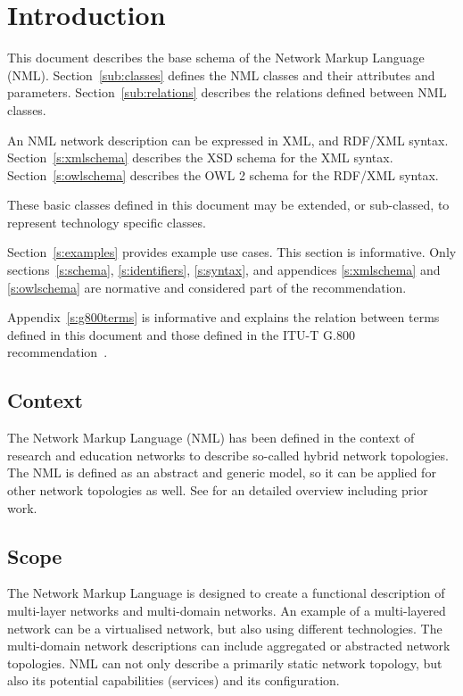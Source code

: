
\section{Introduction}%
\label{sec:introduction}

This document describes the base schema of the Network Markup Language (NML).
Section~\ref{sub:classes} defines the NML classes and their attributes and parameters.
Section~\ref{sub:relations} describes the relations defined between NML classes.

An NML network description can be expressed in XML\cite{xml}, and RDF/XML\cite{rdfxml} syntax.
Section~\ref{s:xmlschema} describes the XSD schema for the XML syntax.
Section~\ref{s:owlschema} describes the OWL 2 schema for the RDF/XML syntax.

These basic classes defined in this document may be extended, or sub-classed, 
to represent technology specific classes.

Section~\ref{s:examples} provides example use cases. This section is informative. 
Only sections~\ref{s:schema}, \ref{s:identifiers}, \ref{s:syntax}, and appendices \ref{s:xmlschema} and \ref{s:owlschema} are normative and considered 
part of the recommendation.

Appendix~\ref{s:g800terms} is informative and explains the relation between terms defined in this document and those defined in the ITU-T G.800 recommendation~\cite{g800}.

\subsection{Context}
\label{sec:context}

The Network Markup Language (NML) has been defined in the context of research and 
education networks to describe so-called hybrid network topologies. The NML is defined
as an abstract and generic model, so it can be applied for other network topologies as well.
See \cite{gfd.165} for an detailed overview including prior work.

\subsection{Scope}
\label{sec:scope}

The Network Markup Language is designed to create a functional description of 
multi-layer networks and multi-domain networks. An example of a multi-layered 
network can be a virtualised network, but also using different technologies. 
The multi-domain network descriptions can include aggregated or abstracted network topologies.
NML can not only describe a primarily static network topology, but also its potential capabilities (services) 
and its configuration.

